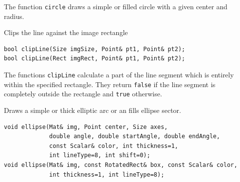 The function \texttt{circle} draws a simple or filled circle with a
given center and radius.

\label{clipLine}
Clips the line against the image rectangle

\begin{lstlisting}
bool clipLine(Size imgSize, Point& pt1, Point& pt2);
bool clipLine(Rect imgRect, Point& pt1, Point& pt2);
\end{lstlisting}
\begin{description}
\end{description}

The functions \texttt{clipLine} calculate a part of the line
segment which is entirely within the specified rectangle.
They return \texttt{false} if the line segment is completely outside the rectangle and \texttt{true} otherwise.


\label{ellipse}
Draws a simple or thick elliptic arc or an fills ellipse sector.

\begin{lstlisting}
void ellipse(Mat& img, Point center, Size axes,
             double angle, double startAngle, double endAngle,
             const Scalar& color, int thickness=1,
             int lineType=8, int shift=0);
void ellipse(Mat& img, const RotatedRect& box, const Scalar& color,
             int thickness=1, int lineType=8);
\end{lstlisting}
\begin{description}
\end{description}

